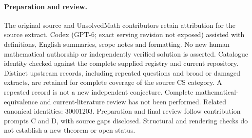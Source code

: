 \documentclass[11pt]{article}
\begin{document}
\paragraph{Preparation and review.}
The original source and UnsolvedMath contributors retain attribution for the source extract. Codex (GPT-6; exact serving revision not exposed) assisted with definitions, English summaries, scope notes and formatting. No new human mathematical authorship or independently verified solution is asserted. Catalogue identity checked against the complete supplied registry and current repository. Distinct upstream records, including repeated questions and broad or damaged extracts, are retained for complete coverage of the source CS category. A repeated record is not a new independent conjecture. Complete mathematical-equivalence and current-literature review has not been performed. Related canonical identities: 30001203. Preparation and final review follow contribution prompts C and D, with source gaps disclosed. Structural and rendering checks do not establish a new theorem or open status.
\label{end:statement}
\end{document}
